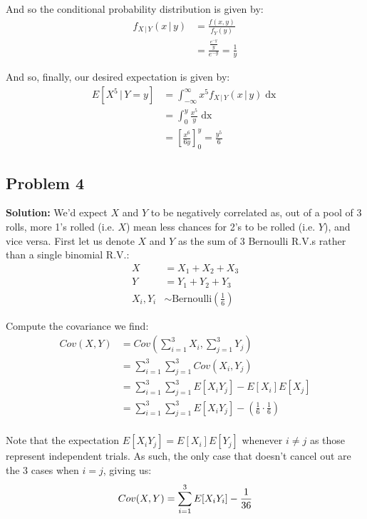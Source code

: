 \documentclass{article}
\newcommand*\eval[3]{\left[#1\right]_{#2}^{#3}}
\newcommand*\pbar[0]{\,|\,}
\begin{document}
And so the conditional probability distribution is given by:
\begin{align*}
    f_{X\pbar Y}(x\pbar y)&=\frac{f(x,y)}{f_Y(y)}\\
    &=\frac{\frac{e^{-y}}{y}}{e^{-y}}=\frac{1}{y}
\end{align*}

And so, finally, our desired expectation is given by:
\begin{align*}
    E[X^5\pbar Y=y]&=\int_{-\infty}^\infty x^5f_{X\pbar Y}(x\pbar y)\mathop{dx}\\
    &=\int_0^y \frac{x^5}{y}\mathop{dx}\\
    &=\eval{\frac{x^6}{6y}}{0}{y}=\frac{y^5}{6}
\end{align*}

\subsection*{Problem 4}
\noindent\textbf{Solution:} We'd expect $X$ and $Y$ to be negatively correlated as, out of a pool of 3 rolls, more 1's rolled (i.e. $X$) mean less chances for 2's to be rolled (i.e. $Y$), and vice versa. First let us denote $X$ and $Y$ as the sum of 3 Bernoulli R.V.s rather than a single binomial R.V.:
\begin{align*}
    X&=X_1+X_2+X_3\\
    Y&=Y_1+Y_2+Y_3\\
    X_i,Y_i&\sim \text{Bernoulli}\left(\frac{1}{6}\right)
\end{align*} 

Compute the covariance we find:
\begin{align*}
    Cov(X,Y)&=Cov\left(\sum_{i=1}^3 X_i,\sum_{j=1}^3 Y_j\right)\\
    &=\sum_{i=1}^3 \sum_{j=1}^3 Cov(X_i,Y_j)\\
    &=\sum_{i=1}^3 \sum_{j=1}^3 E[X_iY_j]-E[X_i]E[X_j]\\
    &=\sum_{i=1}^3 \sum_{j=1}^3 E[X_iY_j]-\left(\frac{1}{6}\cdot\frac{1}{6}\right)\tag{expectation of bernoulli R.V.}\\
\end{align*}

Note that the expectation $E[X_iY_j]=E[X_i]E[Y_j]$ whenever $i\not=j$ as those represent independent trials. As such, the only case that doesn't cancel out are the 3 cases when $i=j$, giving us:
\begin{equation*}
    Cov(X,Y)=\sum_{i=1}^3 E[X_iY_i]-\frac{1}{36}\\
\end{equation*}
\end{document}
